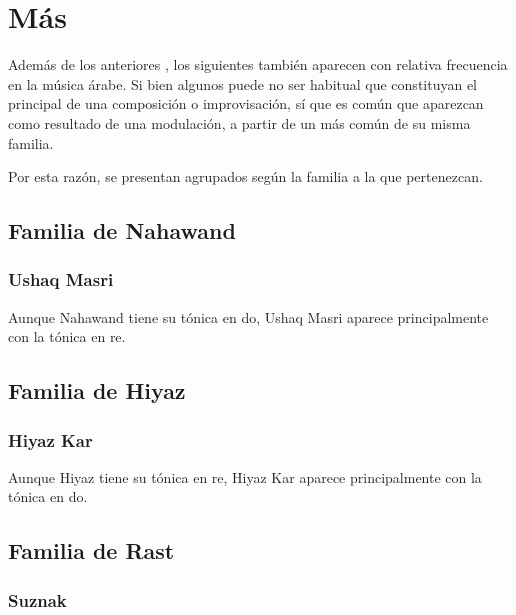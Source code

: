 


\section{Más \maqamaatb}
\label{masmaqamaat}

Además de los anteriores \maqamaatb, los siguientes también aparecen con relativa frecuencia en la música árabe. Si bien algunos puede no ser habitual que constituyan el \maqam principal de una composición o improvisación, sí que es común que aparezcan como resultado de una modulación, a partir de un \maqam más común de su misma familia.

Por esta razón, se presentan agrupados según la familia a la que pertenezcan.



\subsection{Familia de \yins Nahawand}
\subsubsection{\Maqam Ushaq Masri}

Aunque \maqam Nahawand tiene su tónica en do, \maqam Ushaq Masri aparece principalmente con la tónica en re.



\subsection{Familia de \yins Hiyaz}

\subsubsection{\Maqam Hiyaz Kar}

Aunque \maqam Hiyaz tiene su tónica en re, \maqam Hiyaz Kar aparece principalmente con la tónica en do.



\subsection{Familia de \yins Rast}
\subsubsection{\Maqam Suznak}

